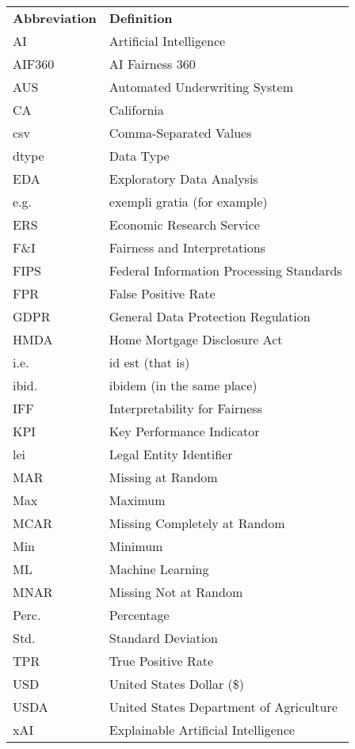 \documentclass[
	12pt, 
	a4paper, 
	oneside,
	parskip=half*, %
	openany,  %
	listof=totoc, %
	bibliography=totoc, %
	index=totoc, %
  toc=chapterentrywithdots, %
  numbers=noenddot, %
]{scrbook}
\begin{document}
\setlength{\LTleft}{-0.45em}  %

\begin{longtable}{ll}
\large\textbf{Abbreviation} & \large\textbf{Definition} \\
AI & Artificial Intelligence \\
AIF360 & AI Fairness 360 \\
AUS & Automated Underwriting System \\
CA & California \\
csv & Comma-Separated Values \\
dtype & Data Type \\
EDA & Exploratory Data Analysis \\
e.g. & exempli gratia (for example) \\
ERS & Economic Research Service \\
F\&I & Fairness and Interpretations \\
FIPS & Federal Information Processing Standards \\
FPR & False Positive Rate \\
GDPR & General Data Protection Regulation \\
HMDA & Home Mortgage Disclosure Act \\
i.e. & id est (that is) \\
ibid. & ibidem (in the same place) \\
IFF & Interpretability for Fairness \\
KPI & Key Performance Indicator \\
lei & Legal Entity Identifier \\
MAR & Missing at Random \\
Max & Maximum \\
MCAR & Missing Completely at Random \\
Min & Minimum \\
ML & Machine Learning \\
MNAR & Missing Not at Random \\
Perc. & Percentage \\
Std. & Standard Deviation \\
TPR & True Positive Rate \\
USD & United States Dollar (\$) \\
USDA & United States Department of Agriculture \\
xAI & Explainable Artificial Intelligence \\
\end{longtable}




\mainmatter
\setcounter{page}{1}





\printbibliography
\end{document}

